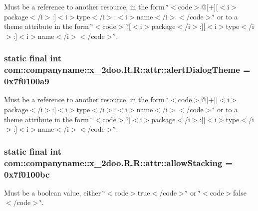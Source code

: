 Must be a reference to another resource, in the form \char`\"{}$<$code$>$@\mbox{[}+\mbox{]}\mbox{[}$<$i$>$package$<$/i$>$:\mbox{]}$<$i$>$type$<$/i$>$:$<$i$>$name$<$/i$>$$<$/code$>$\char`\"{} or to a theme attribute in the form \char`\"{}$<$code$>$?\mbox{[}$<$i$>$package$<$/i$>$:\mbox{]}\mbox{[}$<$i$>$type$<$/i$>$:\mbox{]}$<$i$>$name$<$/i$>$$<$/code$>$\char`\"{}. \hypertarget{classcom_1_1companyname_1_1x__2doo_1_1_r_1_1attr_9a4df1fe76c41f0e6ca79ef95c260cec}{
\subsubsection[{alertDialogTheme}]{\setlength{\rightskip}{0pt plus 5cm}static final int com::companyname::x\_\-2doo.R.R::attr::alertDialogTheme = 0x7f0100a9}}
\label{classcom_1_1companyname_1_1x__2doo_1_1_r_1_1attr_9a4df1fe76c41f0e6ca79ef95c260cec}


Must be a reference to another resource, in the form \char`\"{}$<$code$>$@\mbox{[}+\mbox{]}\mbox{[}$<$i$>$package$<$/i$>$:\mbox{]}$<$i$>$type$<$/i$>$:$<$i$>$name$<$/i$>$$<$/code$>$\char`\"{} or to a theme attribute in the form \char`\"{}$<$code$>$?\mbox{[}$<$i$>$package$<$/i$>$:\mbox{]}\mbox{[}$<$i$>$type$<$/i$>$:\mbox{]}$<$i$>$name$<$/i$>$$<$/code$>$\char`\"{}. \hypertarget{classcom_1_1companyname_1_1x__2doo_1_1_r_1_1attr_ee469da1af224422e3d73b580484b9b8}{
\subsubsection[{allowStacking}]{\setlength{\rightskip}{0pt plus 5cm}static final int com::companyname::x\_\-2doo.R.R::attr::allowStacking = 0x7f0100bc}}
\label{classcom_1_1companyname_1_1x__2doo_1_1_r_1_1attr_ee469da1af224422e3d73b580484b9b8}


Must be a boolean value, either \char`\"{}$<$code$>$true$<$/code$>$\char`\"{} or \char`\"{}$<$code$>$false$<$/code$>$\char`\"{}. 

